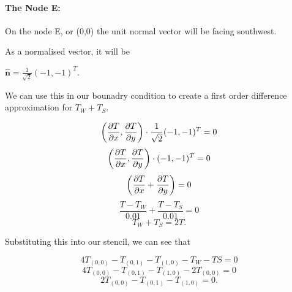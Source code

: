 \documentclass[12pt,a4paper]{article}
\begin{document}
\paragraph*{The Node E:}
On the node E, or (0,0) the unit normal vector will be facing southwest.
\begin{center}
\end{center}
As a normalised vector, it will be 
\begin{center}
    $\hat{\textbf{n}} = \frac{1}{\sqrt{2}}(-1,-1)^T$.
\end{center}
We can use this in our bounadry condition to create a first order difference approximation for $T_W + T_S$.
\begin{center}
  \[\bigg{(}\frac{\partial T}{\partial x},\frac{\partial T}{\partial y}\bigg{)}\cdot \frac{1}{\sqrt{2}}(-1,-1)^T = 0\]
  \[\bigg{(}\frac{\partial T}{\partial x},\frac{\partial T}{\partial y}\bigg{)}\cdot (-1,-1)^T = 0\]
  \[\bigg{(}\frac{\partial T}{\partial x}+\frac{\partial T}{\partial y}\bigg{)} = 0\]
  \[\frac{T-T_W}{0.01}+\frac{T-T_S}{0.01} = 0\]
  \[T_W+T_S=2T.\]
\end{center}
Substituting this into our stencil, we can see that 
\begin{center}
\[4T_{(0,0)}-T_{(0,1)}-T_{(1,0)}-T_{W}-T{S}=0\]
\[4T_{(0,0)}-T_{(0,1)}-T_{(1,0)}-2T_{(0,0)}=0\]
\[2T_{(0,0)}-T_{(0,1)}-T_{(1,0)}=0.\]
\end{center}
\end{document}
